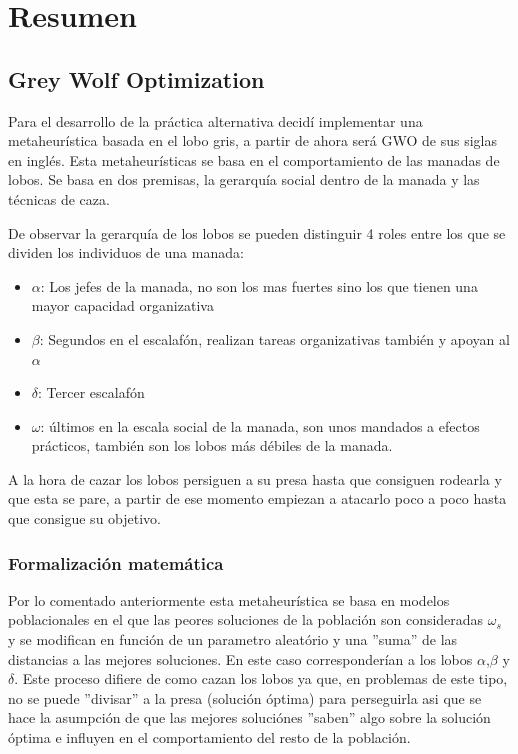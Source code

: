 \documentclass[a4paper, 12.5pt]{report}
\begin{document}
\tableofcontents


\section{Resumen}\label{sec:resumen}

\subsection{Grey Wolf Optimization}

Para el desarrollo de la práctica alternativa decidí implementar una metaheurística basada en el lobo gris, a partir de ahora será GWO de sus siglas en inglés. Esta metaheurísticas se basa en el comportamiento de las manadas de lobos. Se basa en dos premisas, la gerarquía social dentro de la manada y las técnicas de caza.

De observar la gerarquía de los lobos se pueden distinguir 4 roles entre los que se dividen los individuos de una manada:
\begin{itemize}
	\item $\alpha$: Los jefes de la manada, no son los mas fuertes sino los que tienen una mayor capacidad organizativa
	\item $\beta$: Segundos en el escalafón, realizan tareas organizativas también y apoyan al $\alpha$
	\item $\delta$: Tercer escalafón
	\item $\omega$: últimos en la escala social de la manada, son unos mandados a efectos prácticos, también son los lobos más débiles de la manada.
\end{itemize}


A la hora de cazar los lobos persiguen a su presa hasta que consiguen rodearla y que esta se pare, a partir de ese momento empiezan a atacarlo poco a poco hasta que consigue su objetivo.

\subsubsection{Formalización matemática}
Por lo comentado anteriormente esta metaheurística se basa en modelos poblacionales en el que las peores soluciones de la población son consideradas $\omega_s$ y se modifican en función de un parametro aleatório y una ''suma'' de las distancias a las mejores soluciones. En este caso corresponderían a los lobos $\alpha$,$\beta$ y $\delta$. Este proceso difiere de como cazan los lobos ya que, en problemas de este tipo, no se puede ''divisar'' a la presa (solución óptima) para perseguirla asi que se hace la asumpción de que las mejores soluciónes ''saben'' algo sobre la solución óptima e influyen en el comportamiento del resto de la población.
\end{document}
